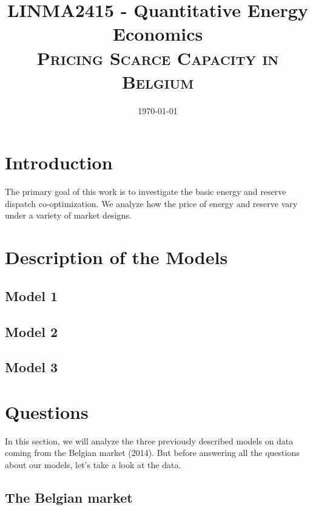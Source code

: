 \documentclass[a4paper,11pt]{article}
\title{\vspace{-2cm}
\centering \bf
\noindent\makebox[\linewidth]{\rule{\linewidth}{0.1cm}}
LINMA2415 - Quantitative Energy Economics\\
\textsc{Pricing Scarce Capacity in Belgium}
\noindent\makebox[\linewidth]{\rule{\linewidth}{0.1cm}}}
\date{\vspace{-1cm} \today \vspace{-0.5cm}}
\author{}
\begin{document}
%
\setcounter{page}{1}
\maketitle
\section{Introduction}
The primary goal of this work is to investigate the basic energy and reserve dispatch co-optimization. We analyze how the price of energy and reserve vary under a variety of market designs.

\section{Description of the Models}
\subsection{Model 1}

\subsection{Model 2}

\subsection{Model 3}


\newpage
\section{Questions}

In this section, we will analyze the three previously described models on data coming from the Belgian market (2014). But before answering all the questions about our models, let's take a look at the data. 

\subsection{The Belgian market}
\end{document}
